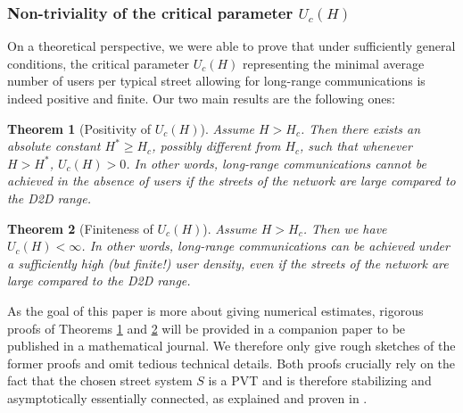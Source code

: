 \documentclass[conference]{IEEEtran}
\newtheorem{theorem}{Theorem}
\begin{document}
\subsubsection{Non-triviality of the critical parameter $U_c(H)$}
On a theoretical perspective, we were able to prove that under sufficiently general conditions, the critical parameter $U_c(H)$ representing the minimal average number of users per typical street allowing for long-range communications is indeed positive and finite. Our two main results are the following ones:
\\
\begin{theorem}[Positivity of $U_c(H)$]
\label{positivity-critical-U}
Assume $H>H_c$. Then there exists an absolute constant $H^{*} \geq H_c$, possibly different from $H_c$, such that whenever $H > H^{*}$, $U_c(H)>0$. In other words, long-range communications cannot be achieved in the absence of users if the streets of the network are large compared to the D2D range. \\
\end{theorem}
\begin{theorem}[Finiteness of $U_c(H)$]
\label{finiteness-critical-U}
Assume $H > H_c$. Then we have $U_c(H) < \infty $. In other words, long-range communications can be achieved under a sufficiently high (but finite!) user density, even if the streets of the network are large compared to the D2D range.
\end{theorem}
\indent As the goal of this paper is more about giving numerical estimates, rigorous proofs of Theorems \ref{positivity-critical-U} and \ref{finiteness-critical-U} will be provided in a companion paper to be published in a mathematical journal. We therefore only give rough sketches of the former proofs and omit tedious technical details. Both proofs crucially rely on the fact that the chosen street system $S$ is a PVT and is therefore stabilizing and asymptotically essentially connected, as explained and proven in \cite{hirsch_continuum_2017}. 
\\
\end{document}
